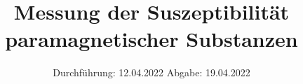 

\subject{VERSUCH NUMMER 606}
\title{Messung der Suszeptibilität paramagnetischer Substanzen}
\date{%
  Durchführung: 12.04.2022
  \hspace{3em}
  Abgabe: 19.04.2022
}



\maketitle
\thispagestyle{empty}
\tableofcontents
\newpage






\printbibliography{}


